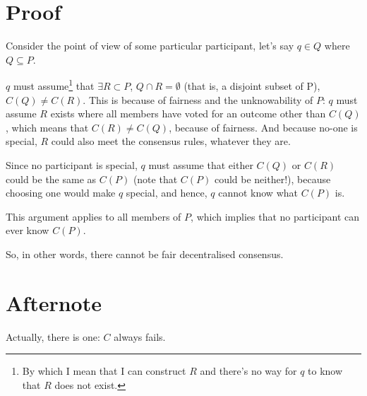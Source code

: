 \documentclass[a4paper]{article}
\begin{document}
\section{Proof}

Consider the point of view of some particular participant, let's say
$q \in Q$ where $Q \subseteq P$.

$q$ must assume\footnote{By which I mean that I can construct $R$ and
  there's no way for $q$ to know that $R$ does not exist.} that
$\exists R \subset P$, $Q \cap R = \emptyset$ (that is, a disjoint
subset of P), $C(Q) \ne C(R)$. This is because of fairness and the
unknowability of $P$: $q$ must assume $R$ exists where all members
have voted for an outcome other than $C(Q)$, which means that $C(R)
\ne C(Q)$, because of fairness. And because no-one is special, $R$
could also meet the consensus rules, whatever they are.

Since no participant is special, $q$ must assume that either $C(Q)$ or
$C(R)$ could be the same as $C(P)$ (note that $C(P)$ could be
neither!), because choosing one would make $q$ special, and hence, $q$
cannot know what $C(P)$ is.

This argument applies to all members of $P$, which implies that no
participant can ever know $C(P)$.

So, in other words, there cannot be fair decentralised consensus.

\section{Afternote}

Actually, there is one: $C$ always fails.
\end{document}
